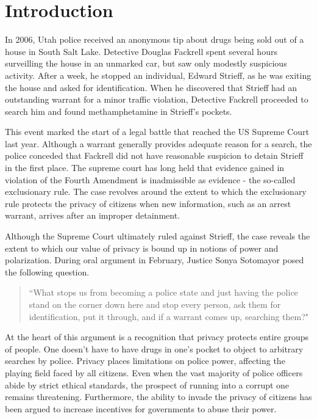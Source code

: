 %

\section{Introduction}
\label{sec:intro}




In 2006, Utah police received an anonymous tip about drugs being sold out of a house in South Salt Lake. Detective Douglas Fackrell spent several hours surveilling the house in an unmarked car, but saw only modestly suspicious activity.  After a week, he stopped an individual, Edward Strieff, as he was exiting the house and asked for identification.  When he discovered that Strieff had an outstanding warrant for a minor traffic violation, Detective Fackrell proceeded to search him and found methamphetamine in Strieff's pockets.  

This event marked the start of a legal battle that reached the US Supreme Court last year.  Although a warrant generally provides adequate reason for a search, the police conceded that Fackrell did not have reasonable suspicion to detain Strieff in the first place.  The supreme court has long held that evidence gained in violation of the Fourth Amendment is inadmissible as evidence - the so-called exclusionary rule.  The case revolves around the extent to which the exclusionary rule protects the privacy of citizens when new information, such as an arrest warrant, arrives after an improper detainment.

Although the Supreme Court ultimately ruled against Strieff, the case reveals the extent to which our value of privacy is bound up in notions of power and polarization.  During oral argument in February, Justice Sonya Sotomayor posed the following question. 

\begin{quote}``What stops us from becoming a police state and just having the police stand on the corner down here and stop every person, ask them for identification, put it through, and if a warrant comes up, searching them?"
\end{quote}

At the heart of this argument is a recognition that privacy protects entire groups of people.  One doesn't have to have drugs in one's pocket to object to arbitrary searches by police.  Privacy places limitations on police power, affecting the playing field faced by all citizens.  Even when the vast majority of police officers abide by strict ethical standards, the prospect of running into a corrupt one remains threatening.  Furthermore, the ability to invade the privacy of citizens has been argued to increase incentives for governments to abuse their power.~\cite{laskowskigovernment}

